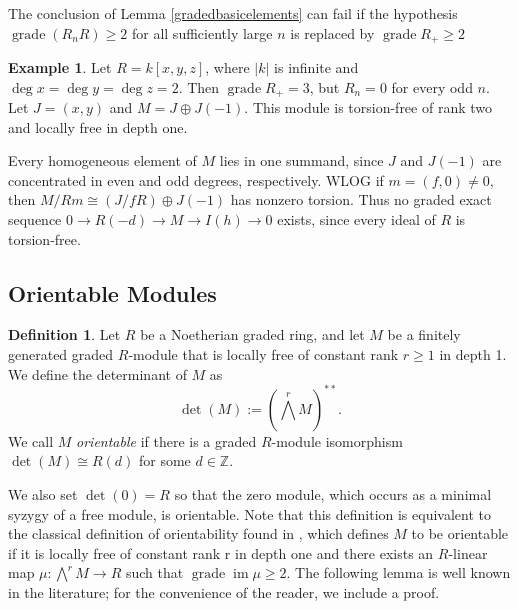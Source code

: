 \documentclass[11pt,letterpaper]{amsart}
\newcommand{\x}{\xrightarrow{}}
\DeclareMathOperator{\img}{im}
\DeclareMathOperator{\gr}{grade}
\theoremstyle{plain}
\theoremstyle{definition}
\newtheorem{defi}[thm]{Definition}
\newtheorem{ex}[thm]{Example}
\theoremstyle{remark}
\begin{document}

The conclusion of Lemma \ref{gradedbasicelements} can fail
if the hypothesis $\gr(R_nR)\geq2$ for all sufficiently large $n$ is
replaced by $\gr R_+\geq2$

\begin{ex}\label{basicelementcounterexample}
Let $R=k[x,y,z]$, where $|k|$ is infinite and
$\deg x=\deg y=\deg z=2$. Then $\operatorname{grade}R_+=3$,
but $R_n=0$ for every odd $n$. Let $J=(x,y)$ and
$M=J\oplus J(-1)$. This module is torsion-free of rank two
and locally free in depth one.

Every homogeneous element of $M$ lies in one summand, since
$J$ and $J(-1)$ are concentrated in even and odd degrees,
respectively. WLOG if $m=(f,0)\ne0$, then
$M/Rm\cong(J/fR)\oplus J(-1)$ has nonzero torsion. Thus no graded
exact sequence $0\to R(-d)\to M\to I(h)\to0$ exists, since
every ideal of $R$ is torsion-free.
\end{ex}

 \subsection{Orientable Modules} \begin{defi}
    Let $R$ be a Noetherian graded ring, and let $M$ be a finitely generated graded $R$-module that is locally free of constant rank $r\ge 1$ in depth 1. We define the determinant of $M$ as \[\det(M):=(\bigwedge^r M)^{**}.\] We call $M$ \emph{orientable} if there is a graded $R$-module isomorphism $\det(M)\cong R(d)$ for some $d\in\mathbb{Z}$.
\end{defi}
We also set $\det(0) = R$ so that the zero module, which occurs as a minimal syzygy of a free module, is
orientable. Note that this definition is equivalent to the classical definition of orientability found in \cite{bruns1986orientations}, which defines $M$ to be orientable if it is locally free of constant rank r in depth one and there exists an $R$-linear map $\mu:\bigwedge^r M\x R$ such that $\gr\img \mu\ge 2$. The following lemma is well known in the literature; for the convenience of the reader, we include a proof.
\end{document}
